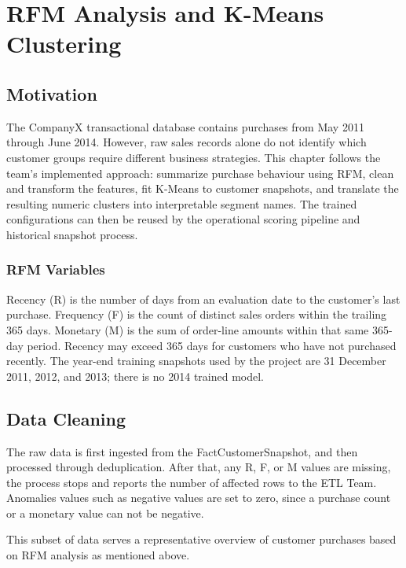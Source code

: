 
\chapter{RFM Analysis and K-Means Clustering}\label{chap:ml}

\section{Motivation}

The CompanyX transactional database contains purchases from May 2011 through June 2014. However, raw sales records
alone do not identify which customer groups require different business strategies. This chapter follows the team's
implemented approach: summarize purchase behaviour using RFM, clean and transform the features, fit K-Means to customer
snapshots, and translate the resulting numeric clusters into interpretable segment names. The trained configurations
can then be reused by the operational scoring pipeline and historical snapshot process.

\subsection{RFM Variables}
Recency (R) is the number of days from an evaluation date to the customer's last purchase. Frequency (F) is the count
of distinct sales orders within the trailing 365 days. Monetary (M) is the sum of order-line amounts within that same
365-day period. Recency may exceed 365 days for customers who have not purchased recently. The year-end training
snapshots used by the project are 31 December 2011, 2012, and 2013; there is no 2014 trained model.

\section{Data Cleaning}

The raw data is first ingested from the FactCustomerSnapshot, and then processed through deduplication. After that, any
R, F, or M values are missing, the process stops and reports the number of affected rows to the ETL Team. Anomalies
values such as negative values are set to zero, since a purchase count or a monetary value can not be negative.

This subset of data serves a representative overview of customer purchases based on RFM analysis as mentioned above.

